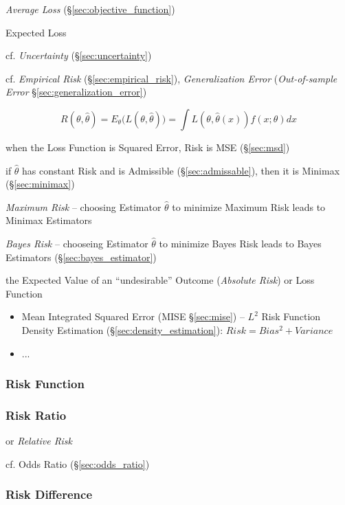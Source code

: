 \emph{Average Loss} (\S\ref{sec:objective_function})

Expected Loss

cf. \emph{Uncertainty} (\S\ref{sec:uncertainty})

cf. \emph{Empirical Risk} (\S\ref{sec:empirical_risk}), \emph{Generalization
Error} (\emph{Out-of-sample Error} \S\ref{sec:generalization_error})

\[
  R(\theta,\hat{\theta}) = E_\theta\Big(L(\theta,\hat{\theta})\Big) =
    \int L(\theta,\hat{\theta}(x))f(x;\theta) dx
\]

when the Loss Function is Squared Error, Risk is MSE (\S\ref{sec:msd})

if $\hat{\theta}$ has constant Risk and is Admissible (\S\ref{sec:admissable}),
then it is Minimax (\S\ref{sec:minimax})

\emph{Maximum Risk} -- choosing Estimator $\hat{\theta}$ to minimize Maximum
Risk leads to Minimax Estimators

\emph{Bayes Risk} -- chooseing Estimator $\hat{\theta}$ to minimize Bayes Risk
leads to Bayes Estimators (\S\ref{sec:bayes_estimator})

the Expected Value of an ``undesirable'' Outcome (\emph{Absolute Risk}) or Loss
Function

\begin{itemize}
  \item Mean Integrated Squared Error (MISE \S\ref{sec:mise}) -- $L^2$ Risk
    Function \fist Density Estimation (\S\ref{sec:density_estimation}):
    $Risk = Bias^2 + Variance$
  \item ...
\end{itemize}



\subsubsection{Risk Function}\label{sec:risk_function}

\subsubsection{Risk Ratio}\label{sec:risk_ratio}

or \emph{Relative Risk}

cf. Odds Ratio (\S\ref{sec:odds_ratio})



\subsubsection{Risk Difference}\label{sec:risk_difference}

